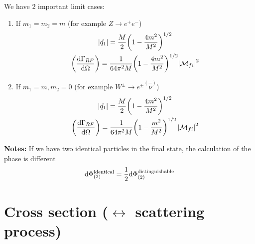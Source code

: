 \begin{example}[1 $\to$ 2 decay]
We have 2 important limit cases:
\begin{enumerate}[label=(\Alph*)]
\item If $m_1 = m_2 = m$ (for example $Z \to e^+ e^-$)
	\begin{gather}
	\left\lvert \hat{q_1} \right\rvert = \frac{M}{2} \biggl( 1 - \frac{4 m^2}{M^2} \biggr)^{1/2} \notag \\
	\biggl( \frac{\textup{d} \Gamma_{RF}}{\textup{d} \Omega} \biggr) = \frac{1}{64 \pi^2 M} \biggl( 1 - \frac{4 m^2}{M^2} \biggl)^{1/2} \left\lvert \mathcal{M}_{fi} \right\rvert^2 \notag
	\end{gather}
\item If $m_1 = m, m_2 = 0$ (for example $W^{\pm} \to e^{\pm} \stackrel{(-)}{\nu}$)
	\begin{gather}
	\left\lvert \hat{q_1} \right\rvert = \frac{M}{2} \biggl( 1 - \frac{4 m^2}{M^2} \biggr)^{1/2} \notag \\
	\biggl( \frac{\textup{d} \Gamma_{RF}}{\textup{d} \Omega} \biggr) = \frac{1}{64 \pi^2 M} \biggl( 1 - \frac{m^2}{M^2} \biggr)^{1/2} \left\lvert \mathcal{M}_{fi} \right\rvert^2 \notag
	\end{gather}
\end{enumerate}
\textbf{Notes:} If we have two identical particles in the final state, the calculation of the phase is different
\[
\textup{d} \Phi_{(2)}^{\textup{identical}} = \frac{1}{2} \textup{d} \Phi_{(2)}^{\textup{distinguishable}}
\]
\end{example}

\section{Cross section ($\leftrightarrow$ scattering process)}

